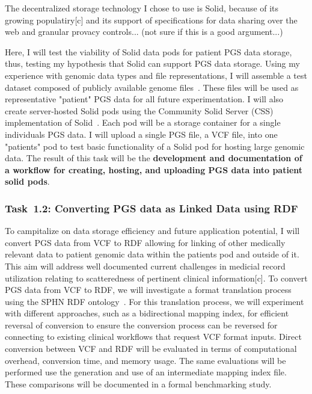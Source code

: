 \documentclass[a4paper,11pt]{article}
\begin{document}
\begin{refsection}
The decentralized storage technology I chose to use is Solid, because of its growing populatiry[c] and its support of specifications for data sharing over the web and granular provacy controls... (not sure if this is a good argument...)

Here, I will test the viability of Solid data pods for patient PGS data storage, thus, testing my hypothesis that Solid can support PGS data storage. 
Using my experience with genomic data types and file representations, I will assemble a test dataset composed of publicly available genome files~\cite{noauthor_platinum_nodate, ...}. 
These files will be used as representative "patient" PGS data for all future experimentation. 
I will also create server-hosted Solid pods using the Community Solid Server (CSS) implementation of Solid~\cite{css}. 
Each pod will be a storage container for a single individual\textquotesingle s PGS data. 
I will upload a single PGS file, a VCF file, into one "patient\textquotesingle s" pod to test basic functionality of a Solid pod for hosting large genomic data. 
The result of this task will be the \textbf{development and documentation of a workflow for creating, hosting, and uploading PGS data into patient solid pods}.




\newcommand\WPab{Converting PGS data as Linked Data using RDF}
\subsubsection{Task~1.2: \WPab}

To campitalize on data storage efficiency and future application potential, I will convert PGS data from VCF to RDF allowing for linking of other medically relevant data to patient genomic data within the patient\textquotesingle s pod and outside of it.
This aim will address well documented current challenges in medicial record utilization relating to scatteredness of pertinent clinical information[c].
To convert PGS data from VCF to RDF, we will investigate a format translation process using the SPHN RDF ontology~\cite{van_der_horst_bridging_2023}. 
For this translation process, we will experiment with different approaches, such as a bidirectional mapping index, for efficient reversal of conversion to ensure the conversion process can be reversed for connecting to existing clinical workflows that request VCF format inputs. 
Direct conversion between VCF and RDF will be evaluated in terms of computational overhead, conversion time, and memory usage.
The same evaluations will be performed use the generation and use of an intermediate mapping index file. 
These comparisons will be documented in a formal benchmarking study.


\end{refsection}
\end{document}
